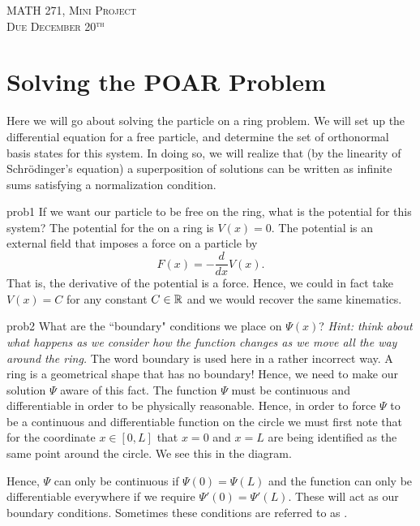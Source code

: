 \documentclass{article}
\begin{document}
\begin{center}
   \LARGE{\textsc{MATH 271, Mini Project}}\\
   \large{\textsc{Due December 20$^\textrm{th}$}}
\end{center}
\vspace{.5cm}

\section*{Solving the POAR Problem}

Here we will go about solving the particle on a ring problem.  We will set up the differential equation for a free particle, and determine the set of orthonormal basis states for this system.  In doing so, we will realize that (by the linearity of Schr\"odinger's equation) a superposition of solutions can be written as infinite sums satisfying a normalization condition.  

\begin{solution}{}{prob1}
		If we want our particle to be free on the ring, what is the potential for this system?
		\tcblower
		The potential for the  on a ring is $V(x)=0$. The potential is an external field that imposes a force on a particle by
		\[
		F(x)=-\frac{d}{dx}V(x).
		\]
		That is, the derivative of the potential is a force.  Hence, we could in fact take $V(x)=C$ for any constant $C\in \mathbb{R}$ and we would recover the same kinematics.
\end{solution}

\begin{solution}{}{prob2}
		What are the ``boundary" conditions we place on $\Psi(x)$? \emph{Hint: think about what happens as we consider how the function changes as we move all the way around the ring.}
		\tcblower
		The word boundary is used here in a rather incorrect way.  A ring is a geometrical shape that has no boundary! Hence, we need to make our solution $\Psi$ aware of this fact.  The function $\Psi$ must be continuous and differentiable in order to be physically reasonable. Hence, in order to force $\Psi$ to be a continuous and differentiable function on the circle we must first note that for the coordinate $x\in [0,L]$ that $x=0$ and $x=L$ are being identified as the same point around the circle. We see this in the diagram.
		
\begin{figure}[H]
	\centering 
	\resizebox{.55\textwidth}{!}{}
\end{figure}
		
		Hence, $\Psi$ can only be continuous if $\Psi(0)=\Psi(L)$ and the function can only be differentiable everywhere if we require $\Psi'(0)=\Psi'(L)$. These will act as our boundary conditions. Sometimes these conditions are referred to as .
\end{solution}
\end{document}
